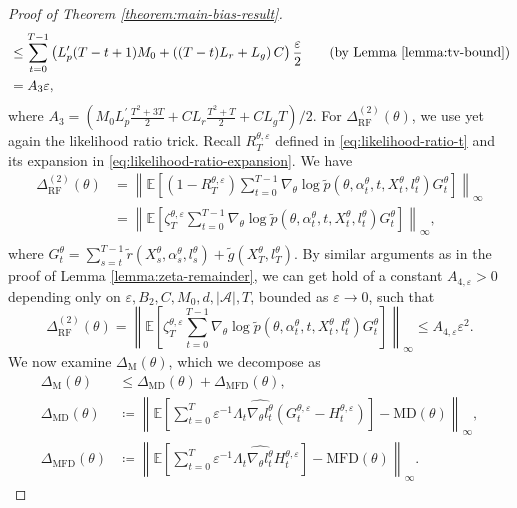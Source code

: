 \documentclass[11pt]{article}
\numberwithin{equation}{section}
\theoremstyle{definition}
\theoremstyle{remark}
\def\eps{\varepsilon}
\def\cA{\mathcal{A}}
\begin{document}
\begin{proof}[Proof of Theorem \ref{theorem:main-bias-result}]
\[\begin{aligned}
 & \leq \sum_{t=0}^{T-1} \left(L_{p}^\prime (T - t + 1) M_0 + \left((T - t)L_r + L_g \right)C\right) \frac{\eps}{2} \quad \quad \text{(by Lemma \ref{lemma:tv-bound})}\\
 &=  A_3\eps,
\end{aligned}
\]
where $A_3 = \left(M_0 L^\prime_p  \frac{T^2 + 3T}{2} + C L_r \frac{T^2 + T}{2} + C L_g T \right)/2$.
For $\Delta_{\mathrm{RF}}^{(2)}(\theta)$, we use yet again the likelihood ratio trick. Recall $R_T^{\theta, \eps}$ defined in \eqref{eq:likelihood-ratio-t} and its expansion in \eqref{eq:likelihood-ratio-expansion}.
We have
\[
\begin{aligned}
\Delta_{\mathrm{RF}}^{(2)}(\theta) &= \left\| \mathbb E \left[ (1 - R_T^{\theta, \eps})\sum_{t=0}^{T-1} \nabla_\theta \log \tilde p (\theta, \alpha_t^{\theta}, t,X_t^{\theta}, l_t^\theta) G_t^{\theta}  \right] \right\|_\infty \\
&= \left\| \mathbb E \left[\zeta_T^{\theta, \eps}\sum_{t=0}^{T-1} \nabla_\theta \log \tilde p (\theta, \alpha_t^{\theta}, t,X_t^{\theta}, l_t^\theta) G_t^{\theta} \right] \right\|_\infty, \\ 
\end{aligned}
\]
where $G_t^{\theta} = \sum_{s=t}^{T-1} \tilde r(X_s^{\theta}, \alpha_s^{\theta}, l_s^{\theta}) + \tilde g(X_T^{\theta}, l_T^{\theta})$. By similar arguments as in the proof of Lemma \ref{lemma:zeta-remainder},
we can get hold of a constant $A_{4,\eps} > 0$ depending only on $\eps, B_2, C, M_0, d, | \cA |, T$, bounded as $\eps \to 0$, such that
\[
 \Delta_{\mathrm{RF}}^{(2)}(\theta) = \left\| \mathbb E \left[\zeta_T^{\theta, \eps}\sum_{t=0}^{T-1} \nabla_\theta \log \tilde p (\theta, \alpha_t^{\theta},t, X_t^{\theta}, l_t^\theta) G_t^{\theta} \right] \right\|_\infty \leq A_{4, \eps} \eps^2.
\]
We now examine $\Delta_{\mathrm M}(\theta)$, which we decompose as
\[
\begin{aligned}
 \Delta_{\mathrm{M}}(\theta) &\leq \Delta_{\mathrm{MD}}(\theta) + \Delta_{\mathrm{MFD}}(\theta), \\
    \Delta_{\mathrm{MD}}(\theta) &\coloneq \left\| \mathbb E \left[\sum_{t=0}^{T} \eps^{-1} \Lambda_t \widehat{\nabla_\theta l^\theta_t} (G_t^{\theta, \eps} - H_t^{\theta, \eps}) \right] - \mathrm{MD}(\theta) \right\|_\infty, \\
    \Delta_{\mathrm{MFD}}(\theta) &\coloneq \left\| \mathbb E \left[\sum_{t=0}^{T} \eps^{-1} \Lambda_t \widehat{\nabla_\theta l^\theta_t} H_t^{\theta, \eps} \right] - \mathrm{MFD}(\theta) \right\|_\infty.
\end{aligned}
\]
\end{proof}
\end{document}
